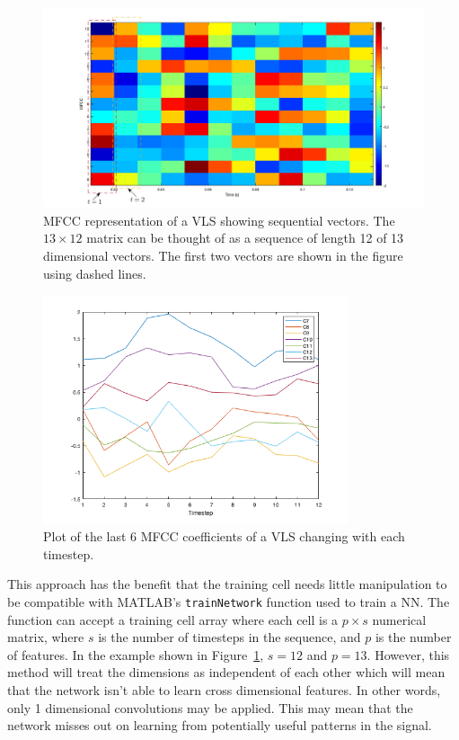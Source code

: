 \begin{figure}[ht]
  \centering
  \includegraphics[width=\textwidth]{figures/mfcc_vector_sequence_labelled_2.png}
  \caption{MFCC representation of a VLS showing sequential vectors. The $13
  \times 12$ matrix can be thought of as a sequence of length 12 of 13
dimensional vectors. The first two vectors are shown in the figure using
dashed lines.}\label{fig:mfcc_vector_sequence}
\end{figure}

\begin{figure}[ht]
  \centering
  \includegraphics[width=0.8\textwidth]{figures/mfcc_vector_sequence_2.png}
  \caption{Plot of the last 6 MFCC coefficients of a VLS changing with each
  timestep.}\label{fig:mfcc_vector_sequence_2}
\end{figure}

This approach has the benefit that the training cell needs little
manipulation to be compatible with MATLAB's \texttt{trainNetwork}
function used to train a NN\@. The function can accept a training cell array
where each cell is a $p \times s$ numerical matrix, where $s$ is the number
of timesteps in the sequence, and $p$ is the number of features. In the
example shown in Figure~\ref{fig:mfcc_vector_sequence}, $s=12$ and $p=13$.
However, this method will treat the dimensions as independent of each other
which will mean that the network isn't able to learn cross dimensional
features. In other words, only 1 dimensional convolutions may be applied.
This may mean that the network misses out on learning from potentially
useful patterns in the signal.

